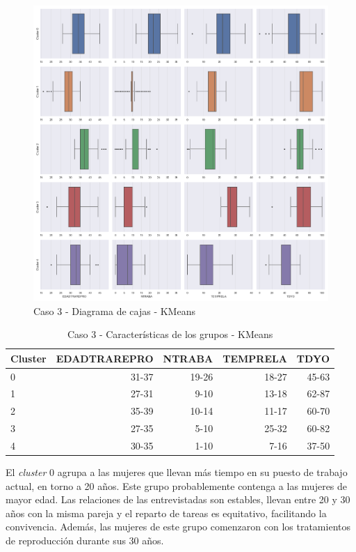 \documentclass[a4paper, 20pt]{article}
\begin{document}
\begin{figure}[H]
    \centering
    \includegraphics[width=1\textwidth]{./caso3/KMeans_boxplot}
    \caption{Caso 3 - Diagrama de cajas - KMeans}
    \label{fig:kmeans_boxplot3}
\end{figure}

\begin{table}[H]
\centering
\caption{Caso 3 - Características de los grupos - KMeans}
\label{tab:kmeans_carac3}
\begin{tabular}{lrrrr}
\toprule
Cluster & EDADTRAREPRO & NTRABA & TEMPRELA & TDYO\\
\midrule
0 & 31-37 & 19-26 & 18-27 & 45-63 \\
1 & 27-31 & 9-10 & 13-18 & 62-87 \\
2 & 35-39 & 10-14 & 11-17 & 60-70 \\
3 & 27-35 & 5-10 & 25-32 & 60-82 \\
4 & 30-35 & 1-10 & 7-16 & 37-50 \\
\bottomrule
\end{tabular}
\end{table}

El \textit{cluster} 0 agrupa a las mujeres que llevan más tiempo en su puesto de trabajo actual, en torno a 20 años. Este grupo probablemente contenga a las mujeres de mayor edad. Las relaciones de las entrevistadas son estables, llevan entre 20 y 30 años con la misma pareja y el reparto de tareas es equitativo, facilitando la convivencia. Además, las mujeres de este grupo comenzaron con los tratamientos de reproducción durante sus 30 años.
\end{document}
